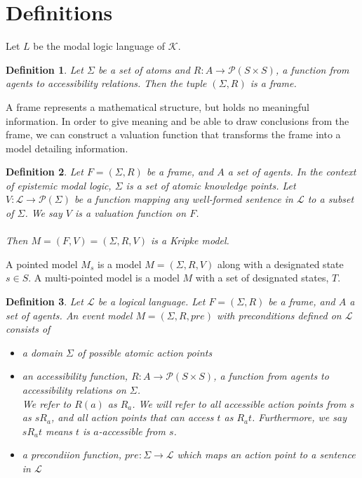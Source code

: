 \documentclass[12pt, a4paper, titlepage]{scrartcl}
\newtheorem{defn}{Definition}
\begin{document}
\section{Definitions}
Let $L$ be the modal logic language of $\mathcal{K}$.
\begin{defn} \label{frame}
	Let $\Sigma$ be a set of atoms and $R: A \to \mathcal{P}(S \times S)$, a function from agents to
	accessibility relations.
	Then the tuple $(\Sigma, R)$ is a frame.
\end{defn}

A frame represents a mathematical structure, but holds no meaningful information.
In order to give meaning and be able to draw conclusions from the frame, we can
construct a valuation function that transforms the frame into a model detailing
information.
\begin{defn} \label{model}
	Let $F = (\Sigma, R)$ be a frame, and $A$ a set of agents.
	In the context of epistemic modal logic, $\Sigma$ is a set of atomic knowledge points.
	Let $V: \mathcal{L} \to \mathcal{P}(\Sigma)$ be a function mapping any
	well-formed	sentence in $\mathcal{L}$ to a subset of $\Sigma$.
	We say $V$ is a valuation function on $F$.\\
	\\
	Then $M = (F, V) = (\Sigma, R, V)$ is a Kripke
	model.
\end{defn}
A pointed model $M_s$ is a model $M = (\Sigma, R, V)$ along with a designated state $s \in S$.
A multi-pointed model is a model $M$ with a set of designated states, $T$.

\begin{defn} \label{evModel}
	Let $\mathcal{L}$ be a logical language.
	Let $F = (\Sigma, R)$ be a frame, and $A$ a set of agents.
	An event model $M = (\Sigma, R, pre)$ with preconditions defined on $\mathcal{L}$ consists of
	\begin{itemize}
		\item a domain $\Sigma$ of possible atomic action points
		\item an accessibility function, $R: A \to \mathcal{P}(S \times S)$, a function from agents to
		accessibility relations on $\Sigma$.\\
		We refer to $R(a)$ as $R_a$.
		We will refer to all accessible action points from $s$ as $s R_a$, and all action points that
		can access $t$ as $R_a t$.
		Furthermore, we say $s R_a t$ means $t$ is $a$-accessible from $s$.
		\item a precondiion function, $pre: \Sigma \to \mathcal{L}$ which maps an action point to a
		sentence in $\mathcal{L}$
	\end{itemize}
\end{defn}
\end{document}
